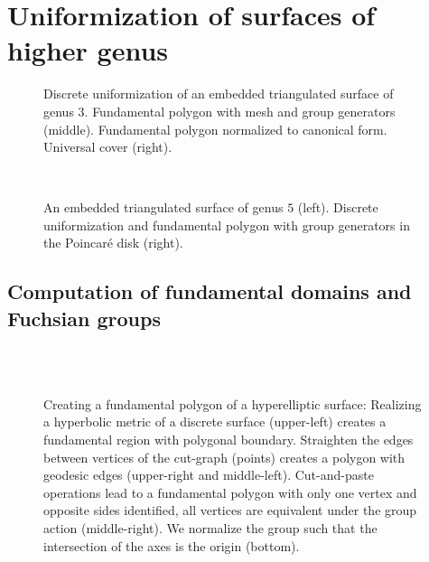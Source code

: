 \documentclass[Thesis]{subfiles}
\begin{document}
\section{Uniformization of surfaces of higher genus}
\label{sec:higher_genus}

\begin{figure}
\centering
{}
\caption{Discrete uniformization of an embedded triangulated surface of genus $3$. Fundamental polygon with mesh and group generators (middle). Fundamental polygon normalized to canonical form. Universal cover (right).}
\label{fig:embedded_genus_3}
\end{figure}

\begin{figure}
\centering
{}\\
\caption{An embedded triangulated surface of genus $5$ (left). Discrete uniformization and fundamental polygon with  group generators in the Poincar\'e disk (right).}
\label{fig:embedded_genus_5}
\end{figure}





\subsection{Computation of fundamental domains and Fuchsian groups}
\label{sec:fundamental_domains}

\begin{figure}
\centering
{}\\
\\
\caption{
Creating a fundamental polygon of a hyperelliptic surface:
Realizing a hyperbolic metric of a discrete surface (upper-left) creates a fundamental region with polygonal boundary.
Straighten the edges between vertices of the cut-graph (points) creates a polygon with geodesic edges (upper-right and middle-left).
Cut-and-paste operations lead to a fundamental polygon with only one vertex and opposite sides identified, all vertices are equivalent under the group action (middle-right).
We normalize the group such that the intersection of the axes is the origin (bottom).
}
\label{fig:fundamental_polygon_algorithm}
\end{figure}
\end{document}
